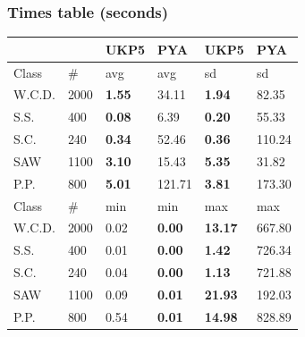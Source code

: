 \documentclass{beamer}
\begin{document}
\begin{frame}
\frametitle{Times table (seconds)}
\center
\begin{tabular}{llllll}
        &  & UKP5 & PYA & UKP5 & PYA\\ \hline
Class & \#	& avg & avg & sd & sd \\ \hline
W.C.D. & 2000 	& \textbf{1.55} & 34.11 & \textbf{1.94} & 82.35 \\ \hline
S.S. & 400 	& \textbf{0.08} & 6.39 & \textbf{0.20} & 55.33 \\ \hline
S.C. & 240 	& \textbf{0.34} & 52.46 & \textbf{0.36} & 110.24 \\ \hline
SAW & 1100	& \textbf{3.10} & 15.43 & \textbf{5.35} & 31.82 \\ \hline
P.P. & 800 	& \textbf{5.01} & 121.71 & \textbf{3.81} & 173.30 \\
\pause
Class & \#	& min & min & max & max \\ \hline
W.C.D. & 2000 	& 0.02 & \textbf{0.00} & \textbf{13.17} & 667.80 \\ \hline
S.S. & 400 	& 0.01 & \textbf{0.00} & \textbf{1.42} & 726.34 \\ \hline
S.C. & 240 	& 0.04 & \textbf{0.00} & \textbf{1.13} & 721.88 \\ \hline
SAW & 1100 	& 0.09 & \textbf{0.01} & \textbf{21.93} & 192.03 \\ \hline
P.P. & 800 	& 0.54 & \textbf{0.01} & \textbf{14.98} & 828.89 \\
\end{tabular}
\end{frame}
\end{document}
